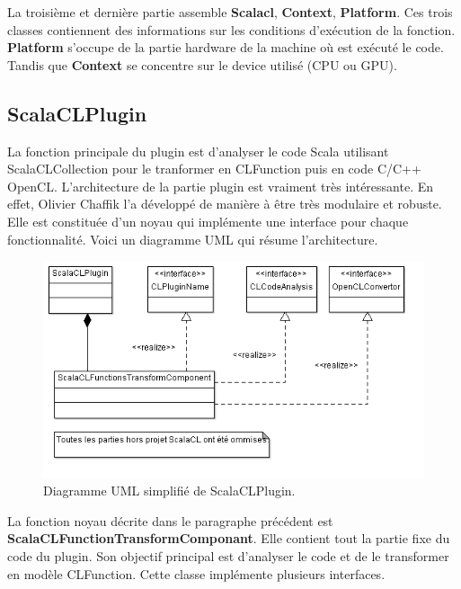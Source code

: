 \documentclass[a4paper,11pt]{report}
\begin{document}
{{\normalsize{
La troisième et dernière partie assemble {\bf Scalacl}, {\bf Context}, {\bf Platform}. Ces trois classes contiennent des informations sur les conditions d'exécution de la fonction. {\bf Platform} s'occupe de la partie hardware de la machine où est exécuté le code. Tandis que {\bf Context} se concentre sur le device utilisé (CPU ou GPU). 
}

\subsection{ScalaCLPlugin}
\vspace{6mm}
\normalsize{
La fonction principale du plugin est d'analyser le code Scala utilisant ScalaCLCollection pour le tranformer en CLFunction puis en code C/C++ OpenCL. L'architecture de la partie plugin est vraiment très intéressante. En effet, Olivier Chaffik l'a développé de manière à être très modulaire et robuste. Elle est constituée d'un noyau qui implémente une interface pour chaque fonctionnalité. Voici un diagramme UML qui résume l'architecture.
}

\begin{figure}[h]
   \begin{center}
   \includegraphics[scale = 0.65]{ClassScalaClPlugin.png}
   \end{center}
  \caption{Diagramme UML simplifié de ScalaCLPlugin.}
\end{figure}

\normalsize{
La fonction noyau décrite dans le paragraphe précédent est {\bf ScalaCLFunctionTransformComponant}. Elle contient tout la partie fixe du code du plugin. Son objectif principal est d'analyser le code et de le transformer en modèle CLFunction. Cette classe implémente plusieurs interfaces.\\

}}}
\end{document}
